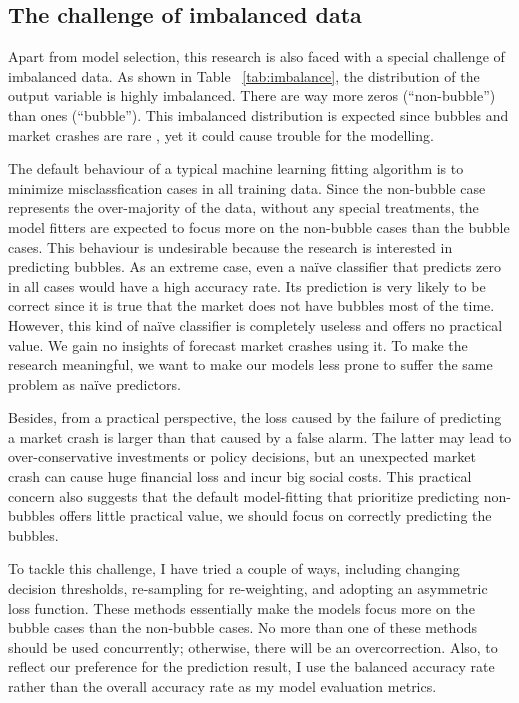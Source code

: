 \documentclass[12pt, man, a4paper, floatsintext]{apa7}
\begin{document}
\subsection{The challenge of imbalanced data}

Apart from model selection, this research is also faced with a special challenge of imbalanced data. As shown in Table ~\ref{tab:imbalance}, the distribution of the output variable is highly imbalanced. There are way more zeros (“non-bubble”) than ones (“bubble”). This imbalanced distribution is expected since bubbles and market crashes are rare , yet it could cause trouble for the modelling. 

The default behaviour of a typical machine learning fitting algorithm is to minimize misclassfication cases in all training data. Since the non-bubble case represents the over-majority of the data, without any special treatments, the model fitters are expected to focus more on the non-bubble cases than the bubble cases. This behaviour is undesirable because the research is interested in predicting bubbles. As an extreme case, even a naïve classifier that predicts zero in all cases would have a high accuracy rate. Its prediction is very likely to be correct since it is true that the market does not have bubbles most of the time. However, this kind of naïve classifier is completely useless and offers no practical value. We gain no insights of forecast market crashes using it. To make the research meaningful, we want to make our models less prone to suffer the same problem as naïve predictors.

Besides, from a practical perspective, the loss caused by the failure of predicting a market crash is larger than that caused by a false alarm. The latter may lead to over-conservative investments or policy decisions, but an unexpected market crash can cause huge financial loss and incur big social costs. This practical concern also suggests that the default model-fitting that prioritize predicting non-bubbles offers little practical value, we should focus on correctly predicting the bubbles.

To tackle this challenge, I have tried a couple of ways, including changing decision thresholds, re-sampling for re-weighting, and adopting an asymmetric loss function. These methods essentially make the models focus more on the bubble cases than the non-bubble cases. No more than one of these methods should be used concurrently; otherwise, there will be an overcorrection. Also, to reflect our preference for the prediction result, I use the balanced accuracy rate rather than the overall accuracy rate as my model evaluation metrics.
\end{document}
